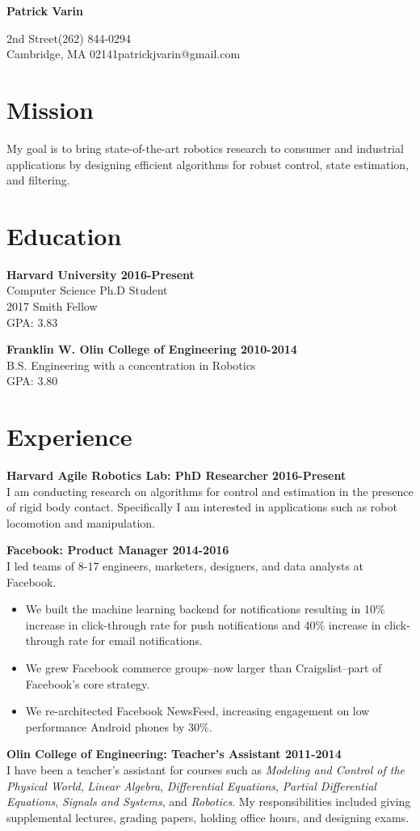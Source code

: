 \documentclass{article}
\newcommand{\name}[1]{\begin{center}\huge\textbf{#1}\end{center}\vspace{2em}}
\newcommand{\personal}[4]{
	\noindent#1\hfill#3\\
	#2\hfill#4
}
\newcommand{\newitem}[2]{\noindent\textbf{#1 \hfill #2}\\}
\newcommand{\gimmespace}{\vspace{1em}}
\begin{document}
\name{Patrick Varin}
\personal{38 2nd Street}{Cambridge, MA 02141}{(262) 844-0294}{patrickjvarin@gmail.com}
\section*{Mission}
\noindent My goal is to bring state-of-the-art robotics research to consumer and industrial applications by designing efficient algorithms for robust control, state estimation, and filtering.

\section*{Education}
\newitem{Harvard University}{2016-Present}
Computer Science Ph.D Student\\
2017 Smith Fellow\\
GPA: 3.83
\gimmespace

\newitem{Franklin W. Olin College of Engineering}{2010-2014}
B.S. Engineering with a concentration in Robotics\\
GPA: 3.80

\section*{Experience}

\newitem{Harvard Agile Robotics Lab: PhD Researcher}{2016-Present}
I am conducting research on algorithms for control and estimation in the presence of rigid body contact. Specifically I am interested in applications such as robot locomotion and manipulation.
\gimmespace

\newitem{Facebook: Product Manager}{2014-2016}
I led teams of 8-17 engineers, marketers, designers, and data analysts at Facebook.
\begin{itemize}
\item We built the machine learning backend for notifications resulting in 10\% increase in click-through rate for push notifications and 40\% increase in click-through rate for email notifications.
\item We grew Facebook commerce groups--now larger than Craigslist--part of Facebook's core strategy.
\item We re-architected Facebook NewsFeed, increasing engagement on low performance Android phones by 30\%.
\end{itemize}
\gimmespace

\newitem{Olin College of Engineering: Teacher's Assistant}{2011-2014}
I have been a teacher's assistant for courses such as \emph{Modeling and Control of the Physical World}, \emph{Linear Algebra}, \emph{Differential Equations}, \emph{Partial Differential Equations}, \emph{Signals and Systems}, and \emph{Robotics}. My responsibilities included giving supplemental lectures, grading papers, holding office hours, and designing exams.
\gimmespace
\end{document}

